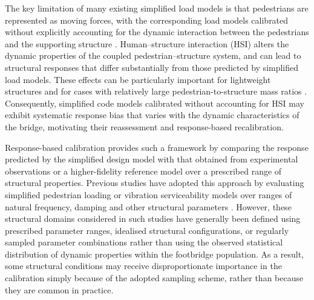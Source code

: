 \documentclass[preprint,a4paper,12pt]{elsarticle}
\begin{document}
The key limitation of many existing simplified load models is that pedestrians are represented as moving forces, with the corresponding load models calibrated without explicitly accounting for the dynamic interaction between the pedestrians and the supporting structure \cite{caprani2016formulation,shahabpoor2016interaction,van2017impact}.
Human--structure interaction (HSI) alters the dynamic properties of the coupled pedestrian--structure system, and can lead to structural responses that differ substantially from those predicted by simplified load models.
These effects can be particularly important for lightweight structures and for cases with relatively large pedestrian-to-structure mass ratios \cite{van2021simplified,van2017impact}. 
Consequently, simplified code models calibrated without accounting for HSI may exhibit systematic response bias that varies with the dynamic characteristics of the bridge, motivating their reassessment and response-based recalibration.

Response-based calibration provides such a framework by comparing the response predicted by the simplified design model with that obtained from experimental observations or a higher-fidelity reference model over a prescribed range of structural properties.
Previous studies have adopted this approach by evaluating simplified pedestrian loading or vibration serviceability models over ranges of natural frequency, damping and other structural parameters \cite{bassoli2018spectral,ahmadi2021experimental,van2017impact, van2021simplified,strobbe2026vibration}.
However, these structural domains considered in such studies have generally been defined using prescribed parameter ranges, idealised structural configurations, or regularly sampled parameter combinations rather than using the observed statistical distribution of dynamic properties within the footbridge population.
As a result, some structural conditions may receive disproportionate importance in the calibration simply because of the adopted sampling scheme, rather than because they are common in practice.
\end{document}
